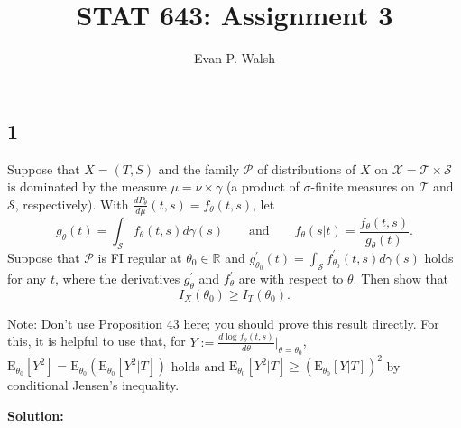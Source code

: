 \documentclass[12pt]{article}
\title{STAT 643: Assignment 3}
\author{Evan P. Walsh}
\begin{document}

\newcommand{\E}{\mathrm{E}}
\renewcommand{\baselinestretch}{1}


\subsection*{1}
\begin{tcolorbox}
  Suppose that $X=(T,S)$ and the family $\mathcal{P}$ of distributions of $X$ on $\mathcal{X}=\mathcal{T}\times \mathcal{S}$ is dominated by the measure $\mu=\nu\times \gamma$ (a product of $\sigma$-finite measures on $\mathcal{T}$ and $\mathcal{S}$, respectively).  With $\frac{d P_\theta}{d \mu}(t,s) = f_\theta(t,s)$, let
  \[
    g_\theta(t) = \int_{\mathcal{S}}f_\theta(t,s) d\gamma(s)  \qquad \mbox{and}\qquad f_\theta(s|t) =\frac{f_\theta(t,s)}{g_\theta(t)}.
  \]
  Suppose that $\mathcal{P}$ is FI regular at $\theta_0 \in \mathbb{R}$ and $g^\prime_{\theta_0}(t)=\int_{\mathcal{S}} f^\prime_{\theta_0}(t,s) d \gamma(s)$ holds for any $t$, where the derivatives $g_\theta^\prime$ and $f_\theta^\prime$ are with respect to $\theta$.  Then show that
  \[
    I_X(\theta_0) \geq I_{T}(\theta_0).
  \]

  \noindent Note:  Don't use Proposition 43 here; you should prove this result directly.    For this, it is helpful to use that, for 
  $Y :=\frac{ d \log f_\theta(t,s) } { d \theta} \big|_{\theta=\theta_0}$,  $\E_{\theta_0}[ Y^2 ] = \E_{\theta_0}( \E_{\theta_0}[ Y^2 |T])$ holds and
  $\E_{\theta_0}[ Y^2 |T] \geq (\E_{\theta_0}[ Y |T])^2$ by conditional Jensen's inequality.
\end{tcolorbox}
\textbf{Solution:}
\end{document}
